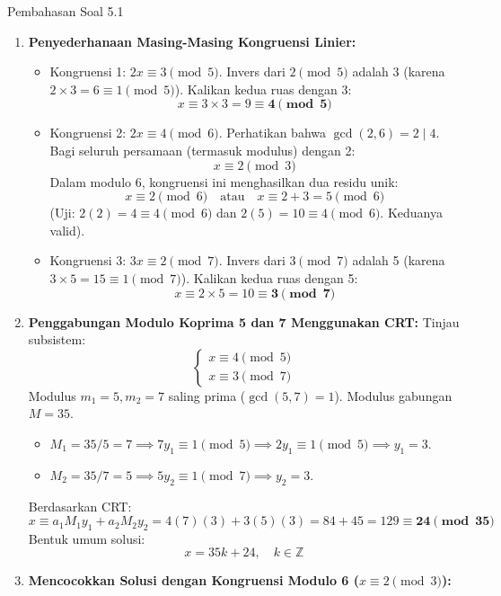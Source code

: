 \documentclass[11pt,a4paper]{article}
\begin{document}
\begin{solusibox}{Pembahasan Soal 5.1}
\begin{enumerate}[leftmargin=*]
    \item \textbf{Penyederhanaan Masing-Masing Kongruensi Linier:}
    \begin{itemize}
        \item Kongruensi 1: $2x \equiv 3 \pmod 5$.
        Invers dari $2 \pmod 5$ adalah 3 (karena $2 \times 3 = 6 \equiv 1 \pmod 5$).
        Kalikan kedua ruas dengan 3:
        \[
        x \equiv 3 \times 3 = 9 \equiv \mathbf{4 \pmod 5}
        \]
        \item Kongruensi 2: $2x \equiv 4 \pmod 6$.
        Perhatikan bahwa $\gcd(2, 6) = 2 \mid 4$. Bagi seluruh persamaan (termasuk modulus) dengan 2:
        \[
        x \equiv 2 \pmod 3
        \]
        Dalam modulo 6, kongruensi ini menghasilkan dua residu unik:
        \[
        x \equiv 2 \pmod 6 \quad \text{atau} \quad x \equiv 2 + 3 = 5 \pmod 6
        \]
        (Uji: $2(2) = 4 \equiv 4 \pmod 6$ dan $2(5) = 10 \equiv 4 \pmod 6$. Keduanya valid).
        \item Kongruensi 3: $3x \equiv 2 \pmod 7$.
        Invers dari $3 \pmod 7$ adalah 5 (karena $3 \times 5 = 15 \equiv 1 \pmod 7$).
        Kalikan kedua ruas dengan 5:
        \[
        x \equiv 2 \times 5 = 10 \equiv \mathbf{3 \pmod 7}
        \]
    \end{itemize}
    \item \textbf{Penggabungan Modulo Koprima 5 dan 7 Menggunakan CRT:}
    Tinjau subsistem:
    \[
    \begin{cases}
    x \equiv 4 \pmod 5 \\
    x \equiv 3 \pmod 7
    \end{cases}
    \]
    Modulus $m_1 = 5, m_2 = 7$ saling prima ($\gcd(5, 7) = 1$). Modulus gabungan $M = 35$.
    \begin{itemize}
        \item $M_1 = 35 / 5 = 7 \implies 7 y_1 \equiv 1 \pmod 5 \implies 2 y_1 \equiv 1 \pmod 5 \implies y_1 = 3$.
        \item $M_2 = 35 / 7 = 5 \implies 5 y_2 \equiv 1 \pmod 7 \implies y_2 = 3$.
    \end{itemize}
    Berdasarkan CRT:
    \[
    x \equiv a_1 M_1 y_1 + a_2 M_2 y_2 = 4(7)(3) + 3(5)(3) = 84 + 45 = 129 \equiv \mathbf{24 \pmod{35}}
    \]
    Bentuk umum solusi:
    \[
    x = 35k + 24, \quad k \in \mathbb{Z}
    \]
    \item \textbf{Mencocokkan Solusi dengan Kongruensi Modulo 6 ($x \equiv 2 \pmod 3$):}

\end{enumerate}
\end{solusibox}
\end{document}
